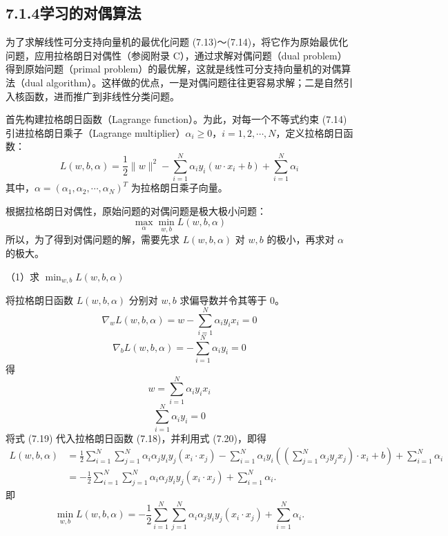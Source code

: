 \documentclass[UTF8, 12pt, fontset=fandol, oneside]{ctexart}
\begin{document}
\subsection*{7.1.4\quad 学习的对偶算法}

为了求解线性可分支持向量机的最优化问题 (7.13)～(7.14)，将它作为原始最优化问题，应用拉格朗日对偶性（参阅附录 C），通过求解对偶问题（dual problem）得到原始问题（primal problem）的最优解，这就是线性可分支持向量机的对偶算法（dual algorithm）。这样做的优点，一是对偶问题往往更容易求解；二是自然引入核函数，进而推广到非线性分类问题。

首先构建拉格朗日函数（Lagrange function）。为此，对每一个不等式约束 (7.14) 引进拉格朗日乘子（Lagrange multiplier）$\alpha_i\geq 0$，$i=1,2,\cdots,N$，定义拉格朗日函数：
\begin{equation}
L(w,b,\alpha)=\frac{1}{2}\|w\|^2-\sum_{i=1}^N\alpha_i y_i(w\cdot x_i+b)+\sum_{i=1}^N\alpha_i
\tag{7.18}
\end{equation}
其中，$\alpha=(\alpha_1,\alpha_2,\cdots,\alpha_N)^T$ 为拉格朗日乘子向量。

根据拉格朗日对偶性，原始问题的对偶问题是极大极小问题：
\[
\max_\alpha\min_{w,b}L(w,b,\alpha)
\]
所以，为了得到对偶问题的解，需要先求 $L(w,b,\alpha)$ 对 $w,b$ 的极小，再求对 $\alpha$ 的极大。

（1）求 $\min_{w,b}L(w,b,\alpha)$

将拉格朗日函数 $L(w,b,\alpha)$ 分别对 $w,b$ 求偏导数并令其等于 0。
\[
\nabla_w L(w,b,\alpha)=w-\sum_{i=1}^N\alpha_i y_i x_i=0
\]
\[
\nabla_b L(w,b,\alpha)=-\sum_{i=1}^N\alpha_i y_i=0
\]
得
\begin{equation}
w=\sum_{i=1}^N\alpha_i y_i x_i
\tag{7.19}
\end{equation}
\begin{equation}
\sum_{i=1}^N\alpha_i y_i=0
\tag{7.20}
\end{equation}
将式 (7.19) 代入拉格朗日函数 (7.18)，并利用式 (7.20)，即得
\[
\begin{aligned}
L(w,b,\alpha)
&=\frac{1}{2}\sum_{i=1}^N\sum_{j=1}^N\alpha_i\alpha_j y_i y_j(x_i\cdot x_j)
-\sum_{i=1}^N\alpha_i y_i\left(\left(\sum_{j=1}^N\alpha_j y_j x_j\right)\cdot x_i+b\right)+\sum_{i=1}^N\alpha_i\\
&=-\frac{1}{2}\sum_{i=1}^N\sum_{j=1}^N\alpha_i\alpha_j y_i y_j(x_i\cdot x_j)+\sum_{i=1}^N\alpha_i .
\end{aligned}
\]
即
\[
\min_{w,b}L(w,b,\alpha)
=-\frac{1}{2}\sum_{i=1}^N\sum_{j=1}^N\alpha_i\alpha_j y_i y_j(x_i\cdot x_j)+\sum_{i=1}^N\alpha_i.
\]
\end{document}
